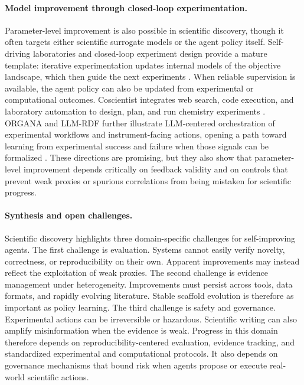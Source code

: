 \documentclass{article}
\begin{document}
\paragraph{Model improvement through closed-loop experimentation.}
Parameter-level improvement is also possible in scientific discovery, though it often targets either scientific surrogate models or the agent policy itself. Self-driving laboratories and closed-loop experiment design provide a mature template: iterative experimentation updates internal models of the objective landscape, which then guide the next experiments \citep{tobias2025autonomous}. When reliable supervision is available, the agent policy can also be updated from experimental or computational outcomes. Coscientist integrates web search, code execution, and laboratory automation to design, plan, and run chemistry experiments \citep{boiko2023autonomous}. ORGANA and LLM-RDF further illustrate LLM-centered orchestration of experimental workflows and instrument-facing actions, opening a path toward learning from experimental success and failure when those signals can be formalized \citep{darvish2025organa, ruan2024automatic}. These directions are promising, but they also show that parameter-level improvement depends critically on feedback validity and on controls that prevent weak proxies or spurious correlations from being mistaken for scientific progress.

\paragraph{Synthesis and open challenges.}
Scientific discovery highlights three domain-specific challenges for self-improving agents. The first challenge is evaluation. Systems cannot easily verify novelty, correctness, or reproducibility on their own. Apparent improvements may instead reflect the exploitation of weak proxies. The second challenge is evidence management under heterogeneity. Improvements must persist across tools, data formats, and rapidly evolving literature. Stable scaffold evolution is therefore as important as policy learning. The third challenge is safety and governance. Experimental actions can be irreversible or hazardous. Scientific writing can also amplify misinformation when the evidence is weak. Progress in this domain therefore depends on reproducibility-centered evaluation, evidence tracking, and standardized experimental and computational protocols. It also depends on governance mechanisms that bound risk when agents propose or execute real-world scientific actions.
\end{document}
